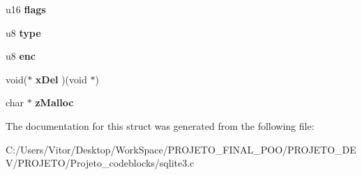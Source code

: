 \begin{DoxyCompactItemize}
\item 
\hypertarget{struct_mem_a209bf3317161d1e33af9fe8b512f4974}{u16 {\bfseries flags}}\label{struct_mem_a209bf3317161d1e33af9fe8b512f4974}

\item 
\hypertarget{struct_mem_a6756879ca1e5fa71b12db25f981b7e87}{u8 {\bfseries type}}\label{struct_mem_a6756879ca1e5fa71b12db25f981b7e87}

\item 
\hypertarget{struct_mem_af437c99e92b8e729b70f82fa94e96bff}{u8 {\bfseries enc}}\label{struct_mem_af437c99e92b8e729b70f82fa94e96bff}

\item 
\hypertarget{struct_mem_a081ea2f86933d68a8940785b62f638ef}{void($\ast$ {\bfseries x\-Del} )(void $\ast$)}\label{struct_mem_a081ea2f86933d68a8940785b62f638ef}

\item 
\hypertarget{struct_mem_a68cd8f196d9dc8ab27845e1b4abbc95c}{char $\ast$ {\bfseries z\-Malloc}}\label{struct_mem_a68cd8f196d9dc8ab27845e1b4abbc95c}

\end{DoxyCompactItemize}


The documentation for this struct was generated from the following file\-:\begin{DoxyCompactItemize}
\item 
C\-:/\-Users/\-Vitor/\-Desktop/\-Work\-Space/\-P\-R\-O\-J\-E\-T\-O\-\_\-\-F\-I\-N\-A\-L\-\_\-\-P\-O\-O/\-P\-R\-O\-J\-E\-T\-O\-\_\-\-D\-E\-V/\-P\-R\-O\-J\-E\-T\-O/\-Projeto\-\_\-codeblocks/sqlite3.\-c\end{DoxyCompactItemize}
